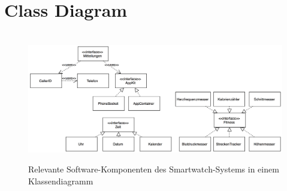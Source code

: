 \section{Class Diagram}

\begin{figure}[h]
\centering\
\includegraphics[width=\textwidth]{img/classdiagram}
\caption{Relevante Software-Komponenten des Smartwatch-Systems in einem Klassendiagramm}\label{fig:class}
\end{figure}
